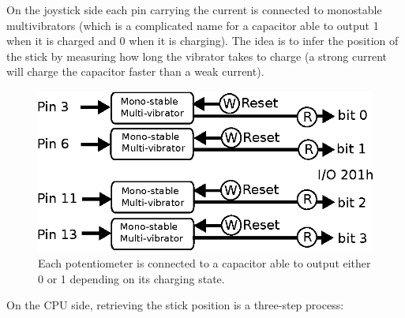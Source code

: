 \documentclass[book.tex]{subfiles}
\begin{document}
\par
On the joystick side each pin carrying the current is connected to monostable multivibrators (which is a complicated name for a capacitor able to output 1 when it is charged and 0 when it is charging). The idea is to infer the position of the stick by measuring how long the vibrator takes to charge (a strong current will charge the capacitor faster than a weak current).\\
\par
\par
\begin{figure}[H]
\centering
\includegraphics[width=\textwidth]{imgs/drawings/joystick_gamecontroller.eps}
\caption{Each potentiometer is connected to a capacitor able to output either 0 or 1 depending on its charging state.}
\end{figure}
\par
On the CPU side, retrieving the stick position is a three-step process:
\end{document}
